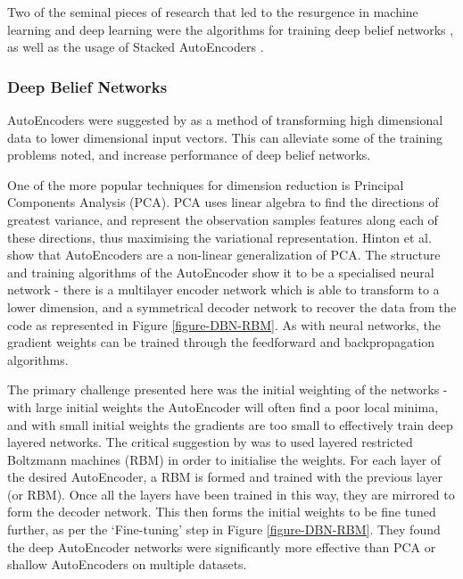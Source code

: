 \documentclass[a4paper,11pt,oneside]{article}
\theoremstyle{plain}
\theoremstyle{definition}
\begin{document}
	
	Two of the seminal pieces of research that led to the resurgence in machine learning and deep learning 
	were the algorithms for training deep belief networks \citep{Hinton1}, as well as the usage of Stacked AutoEncoders \citep{Ranzato1, Bengio1}. 
	
	
	\subsubsection{Deep Belief Networks}\label{DBN}
	
	AutoEncoders were suggested by \citet{Hinton2} as a method of transforming high dimensional 
	data to lower dimensional input vectors. This can alleviate some of the training problems noted, and increase 
	performance of deep belief networks.
	\hfill \break 
	
	One of the more popular techniques for dimension reduction is Principal Components Analysis (PCA). PCA uses linear algebra to find the directions of greatest variance, and represent the observation samples 
	features along each of these directions, thus maximising the variational representation. Hinton et al. show that 
	AutoEncoders are a non-linear generalization of PCA. The structure and training algorithms of the AutoEncoder 
	show it to be a specialised neural network - there is a multilayer encoder network which is able to transform to a 
	lower dimension, and a symmetrical decoder network to recover the data from the code as represented in Figure \ref{figure-DBN-RBM}. As with 
	neural networks, the gradient weights can be trained through the feedforward and backpropagation algorithms.  
	\hfill \break 
	
	The primary challenge presented here was the initial weighting of the networks - with large initial weights the 
	AutoEncoder will often find a poor local minima, and with small initial weights the gradients are too small to 
	effectively train deep layered networks. The critical suggestion by \citet{Hinton3} was to used layered restricted 
	Boltzmann machines (RBM) in order to initialise the weights. For each layer of the desired AutoEncoder, a RBM is 
	formed and trained with the previous layer (or RBM). Once all the layers have been 
	trained in this way, they are mirrored to form the decoder network. This then forms the initial weights to be fine 
	tuned further, as per the `Fine-tuning' step in Figure \ref{figure-DBN-RBM}. They found the deep AutoEncoder networks were significantly more 
	effective than PCA or shallow AutoEncoders on multiple datasets.
	
\end{document}
